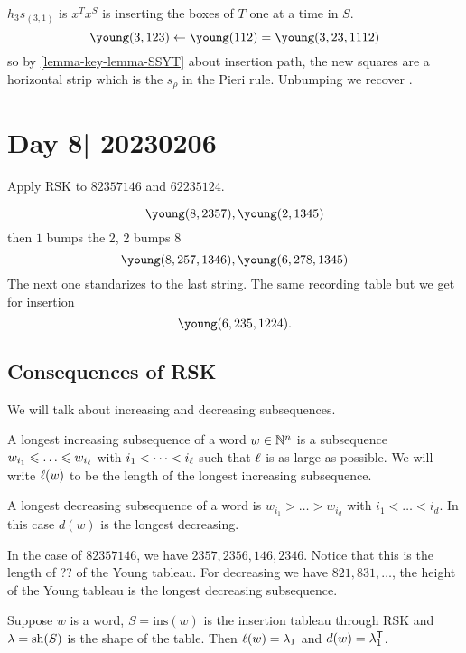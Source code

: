 \documentclass[12pt]{memoir}
\begin{document}
\begin{Ex}
    $h_3s_{(3,1)}$ is $x^Tx^S$ is inserting the boxes of $T$ one at a time in $S$. 
    $$\young(3,123)\leftarrow \young(112)=\young(3,23,1112)$$
    so by \ref{lemma-key-lemma-SSYT} about insertion path, the new squares are a horizontal strip which is the $s_\rho$ in the Pieri rule. Unbumping we recover .
\end{Ex}

\section{Day 8| 20230206}

\begin{Ej}
    Apply RSK to $82357146$ and $62235124$.
\end{Ej}

\begin{ptcbr}
    $$\young(8,2357),\young(2,1345)$$
    then $1$ bumps the 2, 2 bumps 8
    $$\young(8,257,1346),\young(6,278,1345)$$
    The next one standarizes to the last string. The same recording table but we get for insertion 
    $$\young(6,235,1224).$$
\end{ptcbr}

\subsection{Consequences of RSK}

We will talk about increasing and decreasing subsequences.

\begin{Def}
    A longest increasing subsequence of a word $w\in\mathbb{N}^{n}$ is a subsequence $w_{i_1}\leq\dots\leq w_{i_\l}$ with $i_1<\dots<i_\ell$ such that $\ell$ is as large as possible. We will write $\ell(w)$ to be the length of the longest increasing subsequence.\par 
    A longest decreasing subsequence of a word is 
    $w_{i_1}>\dots>w_{i_d}$ with $i_1<\dots<i_d$. In this case $d(w)$ is the longest decreasing.
\end{Def}

\begin{Ex}
    In the case of $82357146$, we have $2357,2356,146,2346$. Notice that this is the length of ?? of the Young tableau. For decreasing we have $821,831,\dots$, the height of the Young tableau is the longest decreasing subsequence.
\end{Ex}

\begin{Th}\label{th-length-long-dec-inc-word}
    Suppose $w$ is a word, $S=\text{ins}(w)$ is the insertion tableau through RSK and $\lambda=\text{sh}(S)$ is the shape of the table. Then $\ell(w)=\lambda_1$ and $d(w)=\lambda_1^{\mathsf{T}}$. 
\end{Th}
\end{document}
